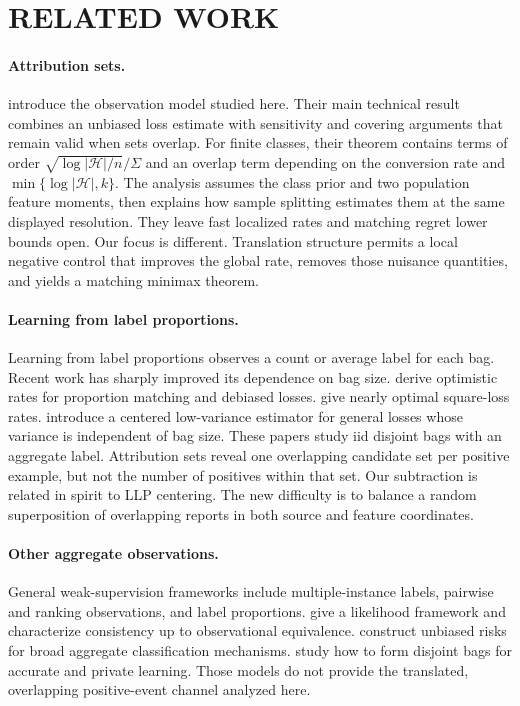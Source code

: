 \documentclass[twoside]{article}
\newcommand{\1}{\mathbf 1}
\newcommand{\cH}{\mathcal H}
\begin{document}
\section{RELATED WORK}

\paragraph{Attribution sets.}
\citet{applebaum2026attribution} introduce the observation model studied here. Their main technical result combines an unbiased loss estimate with sensitivity and covering arguments that remain valid when sets overlap. For finite classes, their theorem contains terms of order $\sqrt{\log|\cH|/n}/\Sigma$ and an overlap term depending on the conversion rate and $\min\{\log|\cH|,k\}$. The analysis assumes the class prior and two population feature moments, then explains how sample splitting estimates them at the same displayed resolution. They leave fast localized rates and matching regret lower bounds open. Our focus is different. Translation structure permits a local negative control that improves the global rate, removes those nuisance quantities, and yields a matching minimax theorem.

\paragraph{Learning from label proportions.}
Learning from label proportions observes a count or average label for each bag. Recent work has sharply improved its dependence on bag size. \citet{li2024optimistic} derive optimistic rates for proportion matching and debiased losses. \citet{busafekete2025nearly} give nearly optimal square-loss rates. \citet{applebaum2026optimal} introduce a centered low-variance estimator for general losses whose variance is independent of bag size. These papers study iid disjoint bags with an aggregate label. Attribution sets reveal one overlapping candidate set per positive example, but not the number of positives within that set. Our subtraction is related in spirit to LLP centering. The new difficulty is to balance a random superposition of overlapping reports in both source and feature coordinates.

\paragraph{Other aggregate observations.}
General weak-supervision frameworks include multiple-instance labels, pairwise and ranking observations, and label proportions. \citet{zhang2020aggregate} give a likelihood framework and characterize consistency up to observational equivalence. \citet{wei2023universal} construct unbiased risks for broad aggregate classification mechanisms. \citet{agarwal2024aggregating} study how to form disjoint bags for accurate and private learning. Those models do not provide the translated, overlapping positive-event channel analyzed here.
\end{document}
